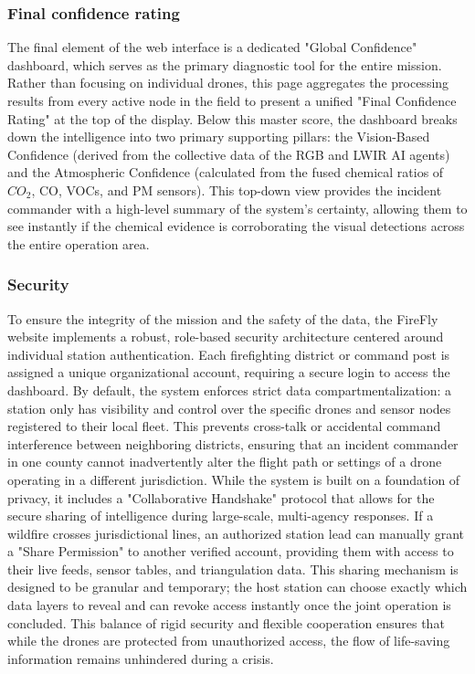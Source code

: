 \documentclass[journal, onecolumn]{IEEEtran}
\begin{document}
\subsubsection{Final confidence rating}
The final element of the web interface is a dedicated "Global Confidence" dashboard, which serves as the primary diagnostic tool for the entire mission. Rather than focusing on individual drones, this page aggregates the processing results from every active node in the field to present a unified "Final Confidence Rating" at the top of the display. Below this master score, the dashboard breaks down the intelligence into two primary supporting pillars: the Vision-Based Confidence (derived from the collective data of the RGB and LWIR AI agents) and the Atmospheric Confidence (calculated from the fused chemical ratios of $CO_2$, CO, VOCs, and PM sensors). This top-down view provides the incident commander with a high-level summary of the system’s certainty, allowing them to see instantly if the chemical evidence is corroborating the visual detections across the entire operation area. 

\subsubsection{Security}
To ensure the integrity of the mission and the safety of the data, the FireFly website implements a robust, role-based security architecture centered around individual station authentication. Each firefighting district or command post is assigned a unique organizational account, requiring a secure login to access the dashboard. By default, the system enforces strict data compartmentalization: a station only has visibility and control over the specific drones and sensor nodes registered to their local fleet. This prevents cross-talk or accidental command interference between neighboring districts, ensuring that an incident commander in one county cannot inadvertently alter the flight path or settings of a drone operating in a different jurisdiction.
While the system is built on a foundation of privacy, it includes a "Collaborative Handshake" protocol that allows for the secure sharing of intelligence during large-scale, multi-agency responses. If a wildfire crosses jurisdictional lines, an authorized station lead can manually grant a "Share Permission" to another verified account, providing them with access to their live feeds, sensor tables, and triangulation data. This sharing mechanism is designed to be granular and temporary; the host station can choose exactly which data layers to reveal and can revoke access instantly once the joint operation is concluded. This balance of rigid security and flexible cooperation ensures that while the drones are protected from unauthorized access, the flow of life-saving information remains unhindered during a crisis.
\end{document}
